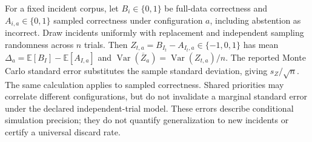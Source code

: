 \documentclass[11pt]{article}
\begin{document}
For a fixed incident corpus, let $B_i\in\{0,1\}$ be full-data correctness and $A_{i,a}\in\{0,1\}$ sampled correctness under configuration $a$, including abstention as incorrect. Draw incidents uniformly with replacement and independent sampling randomness across $n$ trials. Then $Z_{t,a}=B_{I_t}-A_{I_t,a}\in\{-1,0,1\}$ has mean $\Delta_a=\mathbb E[B_I]-\mathbb E[A_{I,a}]$ and $\operatorname{Var}(\overline Z_a)=\operatorname{Var}(Z_{t,a})/n$. The reported Monte Carlo standard error substitutes the sample standard deviation, giving $s_Z/\sqrt n$. The same calculation applies to sampled correctness. Shared priorities may correlate different configurations, but do not invalidate a marginal standard error under the declared independent-trial model. These errors describe conditional simulation precision; they do not quantify generalization to new incidents or certify a universal discard rate.
\end{document}
